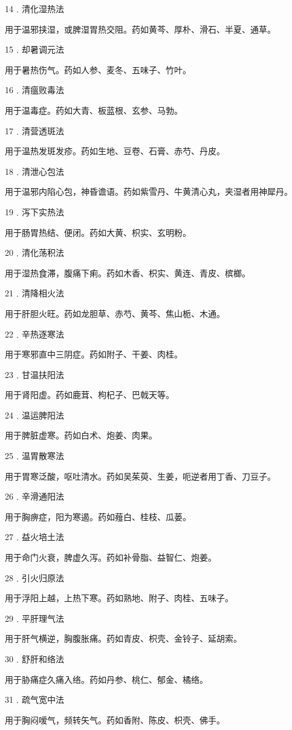 \documentclass[a4paper,12pt,UTF8,twoside]{ctexbook}
\begin{document}
14﹒清化湿热法

用于温邪挟湿，或脾湿胃热交阻。药如黄芩、厚朴、滑石、半夏、通草。

15﹒却暑调元法

用于暑热伤气。药如人参、麦冬、五味子、竹叶。

16﹒清瘟败毒法

用于温毒症。药如大青、板蓝根、玄参、马勃。

17﹒清营透斑法

用于温热发斑发疹。药如生地、豆卷、石膏、赤芍、丹皮。

18﹒清泄心包法

用于温邪内陷心包，神昏谵语。药如紫雪丹、牛黄清心丸，夹湿者用神犀丹。

19﹒泻下实热法

用于肠胃热结、便闭。药如大黄、枳实、玄明粉。

20﹒清化荡积法

用于湿热食滞，腹痛下痢。药如木香、枳实、黄连、青皮、槟榔。

21﹒清降相火法

用于肝胆火旺。药如龙胆草、赤芍、黄芩、焦山栀、木通。

22﹒辛热逐寒法

用于寒邪直中三阴症。药如附子、干姜、肉桂。

23﹒甘温扶阳法

用于肾阳虚。药如鹿茸、枸杞子、巴戟天等。

24﹒温运脾阳法

用于脾脏虚寒。药如白术、炮姜、肉果。

25﹒温胃散寒法

用于胃寒泛酸，呕吐清水。药如吴茱萸、生姜，呃逆者用丁香、刀豆子。

26﹒辛滑通阳法

用于胸痹症，阳为寒遏。药如薤白、桂枝、瓜蒌。

27﹒益火培土法

用于命门火衰，脾虚久泻。药如补骨脂、益智仁、炮姜。

28﹒引火归原法

用于浮阳上越，上热下寒。药如熟地、附子、肉桂、五味子。

29﹒平肝理气法

用于肝气横逆，胸腹胀痛。药如青皮、枳壳、金铃子、延胡索。

30﹒舒肝和络法

用于胁痛症久痛入络。药如丹参、桃仁、郁金、橘络。

31﹒疏气宽中法

用于胸闷嗳气，频转矢气。药如香附、陈皮、枳壳、佛手。
\end{document}
